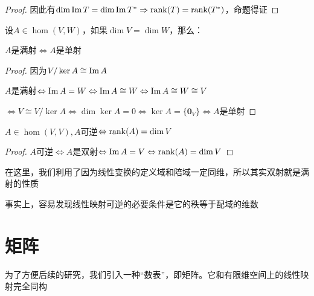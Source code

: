 \documentclass[12pt, a4paper, oneside, UTF8]{ctexbook}
\begin{document}
\begin{para}{0}
\begin{proof}
							因此有$\dim \operatorname{Im} T = \dim \operatorname{Im} T^* \Rightarrow \operatorname{rank}(T)=\operatorname{rank}(T^*)$，命题得证
						\end{proof}
					\point{}
						\begin{proposition}
							设$A \in \hom(V,W)$，如果$\dim V=\dim W$，那么：

							$A$是满射$\Leftrightarrow A$是单射
						\end{proposition}
						\begin{proof}
							因为$V/\ker A \cong \operatorname{Im} A$

							$A$是满射$\Leftrightarrow \operatorname{Im} A = W \Leftrightarrow \operatorname{Im} A \cong W \Leftrightarrow \operatorname{Im} A \cong W \cong V$

							$\Leftrightarrow V \cong V/\ker A \Leftrightarrow \dim \ker A = 0 \Leftrightarrow \ker A = \{\mathbf{0}_V\} \Leftrightarrow A$是单射
						\end{proof}
					\point{}
						\begin{proposition}
							$A \in \hom(V,V),A$可逆$\Leftrightarrow \operatorname{rank}(A) = \dim V$
						\end{proposition}
						\begin{proof}
							$A$可逆$\Leftrightarrow A$是双射$\Leftrightarrow \operatorname{Im} A = V \Leftrightarrow \operatorname{rank}(A)=\dim V$
						\end{proof}
						在这里，我们利用了因为线性变换的定义域和陪域一定同维，所以其实双射就是满射的性质

						事实上，容易发现线性映射可逆的必要条件是它的秩等于配域的维数
				\end{para}
	\section{矩阵}
		为了方便后续的研究，我们引入一种“数表”，即矩阵。它和有限维空间上的线性映射完全同构
\end{document}
